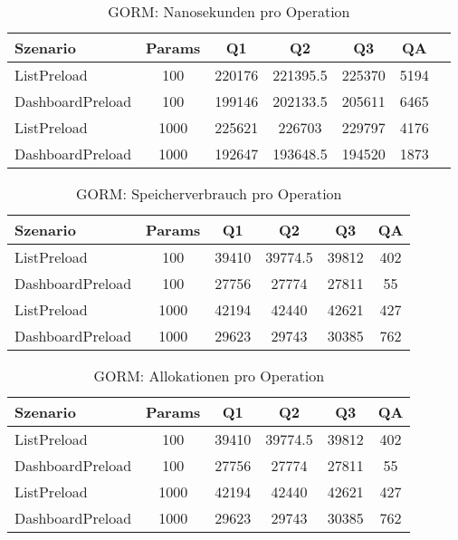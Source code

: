 
\begin{table}[ht]
\centering
\caption{GORM: Nanosekunden pro Operation}
\begin{tabular}{lcccccc}
\toprule
Szenario & Params & Q1 & Q2 & Q3 & QA \\
\midrule
	ListPreload & 100 & 220176 & 221395.5 & 225370 & 5194 \\
	DashboardPreload & 100 & 199146 & 202133.5 & 205611 & 6465 \\
	ListPreload & 1000 & 225621 & 226703 & 229797 & 4176 \\
	DashboardPreload & 1000 & 192647 & 193648.5 & 194520 & 1873 \\
\bottomrule
\end{tabular}
\label{tab:benchmark_gorm_nsperop}
\end{table}
	
\begin{table}[ht]
\centering
\caption{GORM: Speicherverbrauch pro Operation}
\begin{tabular}{lccccc}
\toprule
Szenario & Params & Q1 & Q2 & Q3 & QA \\
\midrule
	ListPreload & 100 & 39410 & 39774.5 & 39812 & 402 \\
	DashboardPreload & 100 & 27756 & 27774 & 27811 & 55 \\
	ListPreload & 1000 & 42194 & 42440 & 42621 & 427 \\
	DashboardPreload & 1000 & 29623 & 29743 & 30385 & 762 \\
\bottomrule
\end{tabular}
\label{tab:benchmark_gorm_bytesperop}
\end{table}
	
\begin{table}[ht]
\centering
\caption{GORM: Allokationen pro Operation}
\begin{tabular}{lccccc}
\toprule
Szenario & Params & Q1 & Q2 & Q3 & QA \\
\midrule
	ListPreload & 100 & 39410 & 39774.5 & 39812 & 402 \\
	DashboardPreload & 100 & 27756 & 27774 & 27811 & 55 \\
	ListPreload & 1000 & 42194 & 42440 & 42621 & 427 \\
	DashboardPreload & 1000 & 29623 & 29743 & 30385 & 762 \\
\bottomrule
\end{tabular}
\label{tab:benchmark_gorm_allocsperop}
\end{table}
	